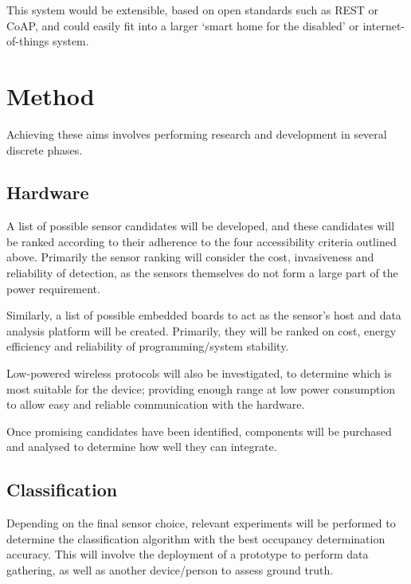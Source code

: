 \documentclass[../thesis/thesis.tex]{subfiles}
\begin{document}
\begin{bibunit}
This system would be extensible, based on open standards such as REST or CoAP, \cite{guinard2012search}\cite{kovatsch2013coap} and could easily fit into a larger `smart home for the disabled' or internet-of-things system.

 
\section{Method}

Achieving these aims involves performing research and development in several discrete phases.

\subsection{Hardware}
A list of possible sensor candidates will be developed, and these candidates will be ranked according to their adherence to the four accessibility criteria outlined above. Primarily the sensor ranking will consider the cost, invasiveness and reliability of detection, as the sensors themselves do not form a large part of the power requirement.

Similarly, a list of possible embedded boards to act as the sensor's host and data analysis platform will be created. Primarily, they will be ranked on cost, energy efficiency and reliability of programming/system stability.

Low-powered wireless protocols will also be investigated, to determine which is most suitable for the device; providing enough range at low power consumption to allow easy and reliable communication with the hardware.

Once promising candidates have been identified, components will be purchased and analysed to determine how well they can integrate.

\subsection{Classification}
Depending on the final sensor choice, relevant experiments will be performed to determine the classification algorithm with the best occupancy determination accuracy. This will involve the deployment of a prototype to perform data gathering, as well as another device/person to assess ground truth.


\end{bibunit}
\end{document}
